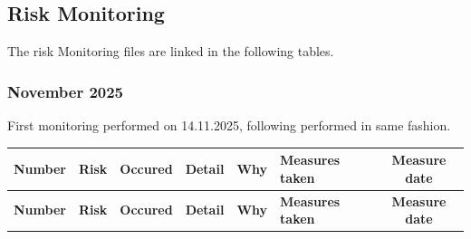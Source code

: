 \begin{landscape}
\chapter{Risk Monitoring}
\label{RiskMonitoring}
The risk Monitoring files are linked in the following tables.
\subsection*{November 2025 }
First monitoring performed on 14.11.2025, following performed in same fashion.

\begin{longtable}{|c|p{4cm}|c|p{3cm}|p{3cm}|p{3cm}|c|}
\hline
\textbf{Number} & \textbf{Risk} & \textbf{Occured} & \textbf{Detail} & \textbf{Why} & \textbf{Measures taken} & \textbf{Measure date} \\ \hline
\endfirsthead

\hline
\textbf{Number} & \textbf{Risk} & \textbf{Occured} & \textbf{Detail} & \textbf{Why} & \textbf{Measures taken} & \textbf{Measure date} \\ \hline
\endhead


\end{longtable}
\end{landscape}
